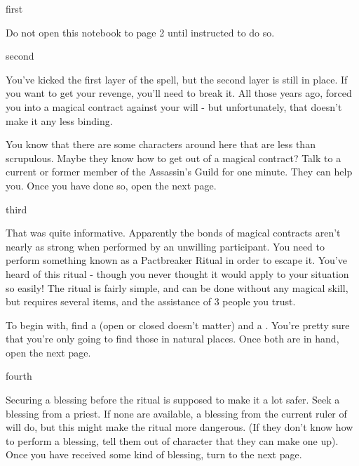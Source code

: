 \documentclass[greennotebook]{NeptuneBall}
\begin{document}


\startnotebook{\nSpellBreakNotebook{}}

\begin{page}{first}

Do not open this notebook to page 2 until instructed to do so.


\end{page}

\begin{page}{second}

You've kicked the first layer of the spell, but the second layer is still in place. If you want to get your revenge, you'll need to break it. All those years ago, \cWitch{} forced you into a magical contract against your will - but unfortunately, that doesn't make it any less binding.

You know that there are some characters around here that are less than scrupulous. Maybe they know how to get out of a magical contract? Talk to a current or former member of the Assassin's Guild for one minute. They can help you. Once you have done so, open the next page.

\end{page}

\begin{page}{third}

That was quite informative. Apparently the bonds of magical contracts aren't nearly as strong when performed by an unwilling participant. You need to perform something known as a Pactbreaker Ritual in order to escape it. You've heard of this ritual - though you never thought it would apply to your situation so easily! The ritual is fairly simple, and can be done without any magical skill, but requires several items, and the assistance of 3 people you trust.

To begin with, find a \iClam{} (open or closed doesn't matter) and a \iSeaFan{}. You're pretty sure that you're only going to find those in natural places. Once both are in hand, open the next page.

\end{page}

\begin{page}{fourth}

Securing a blessing before the ritual is supposed to make it a lot safer. Seek a blessing from a priest. If none are available, a blessing from the current ruler of \pAtlantis{} will do, but this might make the ritual more dangerous. (If they don't know how to perform a blessing, tell them out of character that they can make one up). Once you have received some kind of blessing, turn to the next page.

\end{page}
\end{document}
